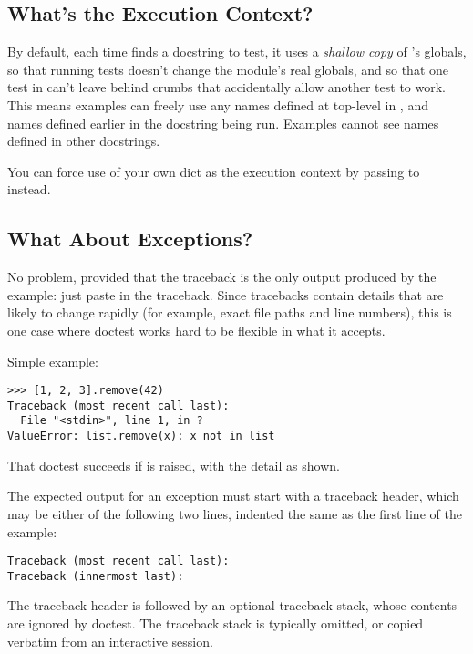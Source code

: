 \subsection{What's the Execution Context?}

By default, each time  finds a docstring to test, it
uses a \emph{shallow copy} of 's globals, so that running tests
doesn't change the module's real globals, and so that one test in
 can't leave behind crumbs that accidentally allow another test
to work.  This means examples can freely use any names defined at top-level
in , and names defined earlier in the docstring being run.
Examples cannot see names defined in other docstrings.

You can force use of your own dict as the execution context by passing
 to  instead.

\subsection{What About Exceptions?}

No problem, provided that the traceback is the only output produced by
the example:  just paste in the traceback.  Since tracebacks contain
details that are likely to change rapidly (for example, exact file paths
and line numbers), this is one case where doctest works hard to be
flexible in what it accepts.

Simple example:

\begin{verbatim}
>>> [1, 2, 3].remove(42)
Traceback (most recent call last):
  File "<stdin>", line 1, in ?
ValueError: list.remove(x): x not in list
\end{verbatim}

That doctest succeeds if  is raised, with the
 detail as shown.

The expected output for an exception must start with a traceback
header, which may be either of the following two lines, indented the
same as the first line of the example:

\begin{verbatim}
Traceback (most recent call last):
Traceback (innermost last):
\end{verbatim}

The traceback header is followed by an optional traceback stack, whose
contents are ignored by doctest.  The traceback stack is typically
omitted, or copied verbatim from an interactive session.

